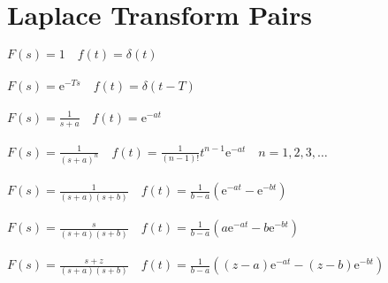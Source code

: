 \documentclass[a4paper, 10pt]{scrartcl}
\newcommand*\euler{\mathrm{e}}
\begin{document}
\section*{Laplace Transform Pairs}
$F(s) = 1 \quad f(t) = \delta(t)$\\
\\
$F(s) = \euler^{-Ts} \quad f(t) = \delta(t - T)$\\
\\
$F(s) = \frac{1}{s + a} \quad f(t) = \euler^{-at}$\\
\\
$F(s) = \frac{1}{(s + a)^{n}} \quad f(t) = \frac{1}{(n - 1)!}t^{n - 1}\euler^{-at} \quad n = 1, 2, 3,\dots $\\
\\
$F(s) = \frac{1}{(s + a)(s + b)} \quad f(t) = \frac{1}{b - a}(\euler^{-at} - \euler^{-bt})$\\
\\
$F(s) = \frac{s}{(s + a)(s + b)} \quad f(t) = \frac{1}{b - a}(a\euler^{-at} - b\euler^{-bt})$\\
\\
$F(s) = \frac{s + z}{(s + a)(s + b)} \quad f(t) = \frac{1}{b - a}((z - a)\euler^{-at} - (z - b)\euler^{-bt})$\\
\end{document}
